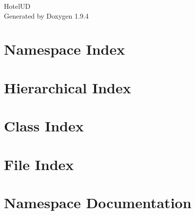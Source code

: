 \documentclass[twoside]{book}
\newcommand{\+}{\discretionary{\mbox{\scriptsize$\hookleftarrow$}}{}{}}
\newcommand{\clearemptydoublepage}{%
    \newpage{\pagestyle{empty}\cleardoublepage}%
  }
\begin{document}
  \raggedbottom
    \hypersetup{pageanchor=false,
                bookmarksnumbered=true,
                pdfencoding=unicode
               }
  \begin{titlepage}
  \vspace*{7cm}
  \begin{center}%
  {\Large Hotel\+UD}\\
  \vspace*{1cm}
  {\large Generated by Doxygen 1.9.4}\\
  \end{center}
  \end{titlepage}
  \clearemptydoublepage
  \tableofcontents
  \clearemptydoublepage
  \hypersetup{pageanchor=true}
\chapter{Namespace Index}

\chapter{Hierarchical Index}

\chapter{Class Index}

\chapter{File Index}

\chapter{Namespace Documentation}




\end{document}
